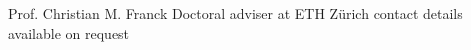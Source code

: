 \begin{cvrefs}
    \cvref
    {Prof. Christian M. Franck} %
    {Doctoral adviser at ETH Zürich} %
    {contact details available on request} %
\end{cvrefs}